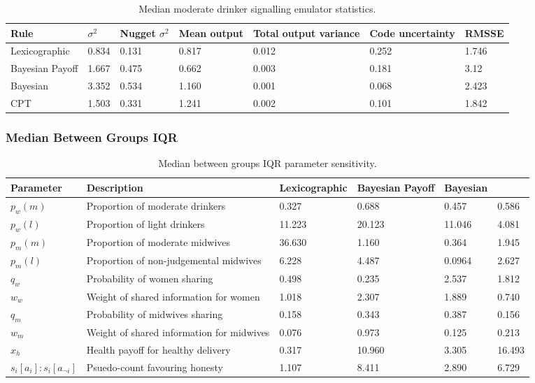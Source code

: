 \begin{table}[h!]
\center
\begin{tabular} {|l | l | l | l | l | l |}
\hline
Rule & \(\sigma^2\) & Nugget \(\sigma^2\) & Mean output & Total output variance & Code uncertainty & RMSSE \\ \hline
Lexicographic & 0.834 & 0.131 &  0.817 & 0.012 & 0.252 & 1.746 \\ \hline
Bayesian Payoff & 1.667 & 0.475 &  0.662 & 0.003 & 0.181 & 3.12 \\ \hline
Bayesian & 3.352 & 0.534 & 1.160 & 0.001 & 0.068 & 2.423 \\ \hline
\ac{CPT} & 1.503 & 0.331 & 1.241 & 0.002 & 0.101 & 1.842 \\ \hline
\end{tabular}
\caption[Table caption text]{Median moderate drinker signalling emulator statistics. \label{tab:sa_emulator_sig}}
\end{table}

\subsubsection{Median Between Groups IQR}

\begin{table}[h!]
\center
\begin{tabular} {|l | l | l | l | l | l |}
\hline
Parameter & Description & Lexicographic & Bayesian Payoff & Bayesian & \ac(CPT) \\ \hline
\(p_{w}(m)\) & Proportion of moderate drinkers & 0.327 & 0.688 & 0.457 & 0.586 \\ \hline
\(p_{w}(l)\) & Proportion of light drinkers & 11.223 & 20.123 & 11.046 & 4.081 \\ \hline
\(p_{m}(m)\) & Proportion of moderate midwives & 36.630 & 1.160 & 0.364 & 1.945 \\ \hline
\(p_{m}(l)\) & Proportion of non-judgemental midwives & 6.228 & 4.487 & 0.0964 & 2.627\\ \hline
\(q_{w}\) & Probability of women sharing & 0.498 & 0.235 & 2.537 & 1.812 \\ \hline
\(w_{w}\) & Weight of shared information for women & 1.018 & 2.307 & 1.889 & 0.740 \\ \hline
\(q_{m}\) & Probability of midwives sharing & 0.158 & 0.343 & 0.387 & 0.156 \\ \hline
\(w_{m}\) & Weight of shared information for midwives & 0.076 & 0.973 & 0.125 & 0.213 \\ \hline
\(x_{h}\) & Health payoff for healthy delivery & 0.317 & 10.960 & 3.305 & 16.493 \\ \hline
\(s_{i}[a_{i}]:s_{i}[a_{\neg i}]\) & Psuedo-count favouring honesty & 1.107 & 8.411 & 2.890 & 6.729 \\ \hline
\end{tabular}
\caption[Table caption text]{Median between groups IQR parameter sensitivity. \label{tab:sa_results_iqr}}
\end{table}


